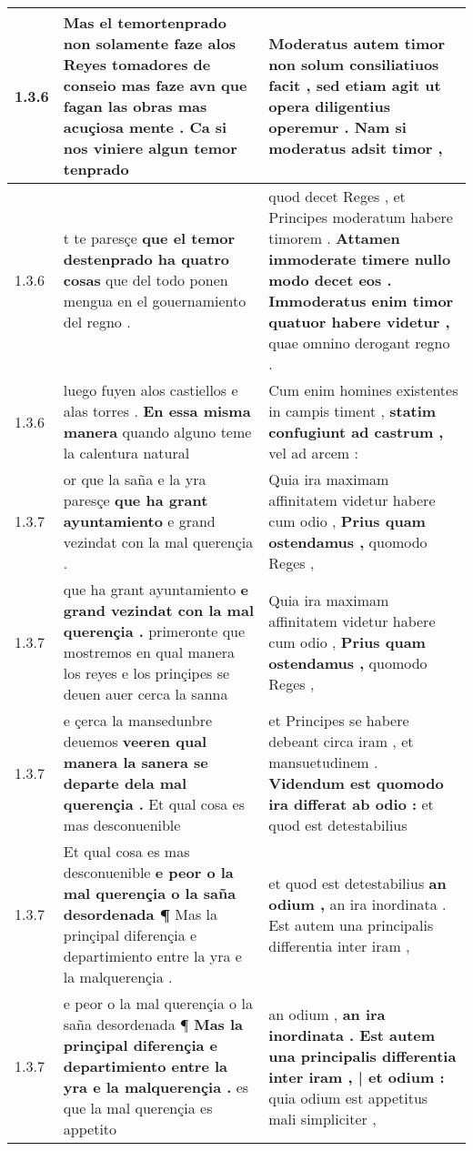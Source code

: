 \begin{tabular}{|p{1cm}|p{6.5cm}|p{6.5cm}|}
1.3.6 & Mas el temortenprado \textbf{ non solamente faze alos Reyes tomadores de conseio mas faze avn que fagan las obras mas acuçiosa mente . } Ca si nos viniere algun temor tenprado & Moderatus autem timor non solum consiliatiuos facit , \textbf{ sed etiam agit ut opera diligentius operemur . } Nam si moderatus adsit timor , \\\hline
1.3.6 & t te paresçe \textbf{ que el temor destenprado ha quatro cosas } que del todo ponen mengua en el gouernamiento del regno . & quod decet Reges , et Principes moderatum habere timorem . \textbf{ Attamen immoderate timere nullo modo decet eos . Immoderatus enim timor quatuor habere videtur , } quae omnino derogant regno . \\\hline
1.3.6 & luego fuyen alos castiellos e alas torres . \textbf{ En essa misma manera } quando alguno teme la calentura natural & Cum enim homines existentes in campis timent , \textbf{ statim confugiunt ad castrum , } vel ad arcem : \\\hline
1.3.7 & or que la saña e la yra paresçe \textbf{ que ha grant ayuntamiento } e grand vezindat con la mal querençia . & Quia ira maximam affinitatem videtur habere cum odio , \textbf{ Prius quam ostendamus , } quomodo Reges , \\\hline
1.3.7 & que ha grant ayuntamiento \textbf{ e grand vezindat con la mal querençia . } primeronte que mostremos en qual manera los reyes e los prinçipes se deuen auer cerca la sanna & Quia ira maximam affinitatem videtur habere cum odio , \textbf{ Prius quam ostendamus , } quomodo Reges , \\\hline
1.3.7 & e çerca la mansedunbre deuemos \textbf{ veeren qual manera la sanera se departe dela mal querençia . } Et qual cosa es mas desconuenible & et Principes se habere debeant circa iram , et mansuetudinem . \textbf{ Videndum est quomodo ira differat ab odio : } et quod est detestabilius \\\hline
1.3.7 & Et qual cosa es mas desconuenible \textbf{ e peor o la mal querençia o la saña desordenada ¶ } Mas la prinçipal diferençia e departimiento entre la yra e la malquerençia . & et quod est detestabilius \textbf{ an odium , } an ira inordinata . Est autem una principalis differentia inter iram , \\\hline
1.3.7 & e peor o la mal querençia o la saña desordenada ¶ \textbf{ Mas la prinçipal diferençia e departimiento entre la yra e la malquerençia . } es que la mal querençia es appetito & an odium , \textbf{ an ira inordinata . Est autem una principalis differentia inter iram , | et odium : } quia odium est appetitus mali simpliciter , \\\hline

\end{tabular}
